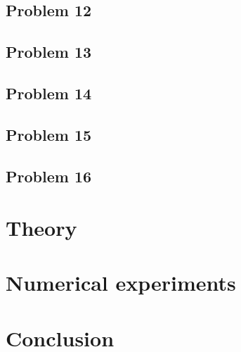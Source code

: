 \documentclass[11pt,a4paper,twoside,norsk]{article}
\begin{document}
\subsection*{Problem 12}


\subsection*{Problem 13}


\subsection*{Problem 14}


\subsection*{Problem 15}


\subsection*{Problem 16}


\section{Theory}
\label{sec:theory}


\section{Numerical experiments}
\label{sec:numexp}


\section{Conclusion}
\label{sec:conclusion}

\fi


 
\end{document}
